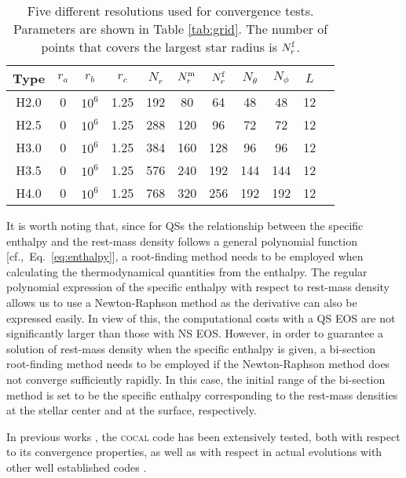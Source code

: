\documentclass[twocolumn,superscriptaddress,showpacs,prd,aps,amsmath,amssymb,nofootinbib]{revtex4-1}
\newcommand{\cocal}{\textsc{cocal}}
\newcommand{\cf}{cf.,~}
\begin{document}
\begin{table}
\begin{tabular}{ccccccccccc}
\hline
Type & $r_a$ & $r_b$ & $r_c$ & $N_r$ & ${N_r^{\rm m}}$ & ${N_r^{\rm f}}$ & $N_\theta$ & $N_\phi$ & $L$ \\
\hline
H2.0 & 0 & $10^6$ & 1.25 & 192 &  80 &  64 &  48 &  48 & 12 \\
H2.5 & 0 & $10^6$ & 1.25 & 288 & 120 &  96 &  72 &  72 & 12 \\
H3.0 & 0 & $10^6$ & 1.25 & 384 & 160 & 128 &  96 &  96 & 12 \\
H3.5 & 0 & $10^6$ & 1.25 & 576 & 240 & 192 & 144 & 144 & 12 \\
H4.0 & 0 & $10^6$ & 1.25 & 768 & 320 & 256 & 192 & 192 & 12\\
\hline
\end{tabular}
\caption{Five different resolutions used for convergence tests.
  Parameters are shown in Table \ref{tab:grid}. The number of points that
  covers the largest star radius is ${N_r^{\rm f}}$.}
\label{tab:reso}
\end{table}

It is worth noting that, since for QSs the relationship between the
specific enthalpy and the rest-mass density follows a general polynomial
function [\cf Eq.~\eqref{eq:enthalpy}], a root-finding method needs to be
employed when calculating the thermodynamical quantities from the
enthalpy. The regular polynomial expression of the specific enthalpy with
respect to rest-mass density allows us to use a Newton-Raphson method as
the derivative can also be expressed easily. In view of this, the
computational costs with a QS EOS are not significantly larger than those
with NS EOS. However, in order to guarantee a solution of rest-mass
density when the specific enthalpy is given, a bi-section root-finding
method needs to be employed if the Newton-Raphson method does not converge
sufficiently rapidly. In this case, the initial range of the bi-section
method is set to be the specific enthalpy corresponding to the rest-mass
densities at the stellar center and at the surface, respectively.


In previous works \cite{Huang08,Uryu:2012b,Uryu2016a,Tsokaros2016}, the
\cocal{} code has been extensively tested, both with respect to its
convergence properties, as well as with respect in actual
evolutions with other well established codes \cite{Tsokaros2016}. 
\end{document}
